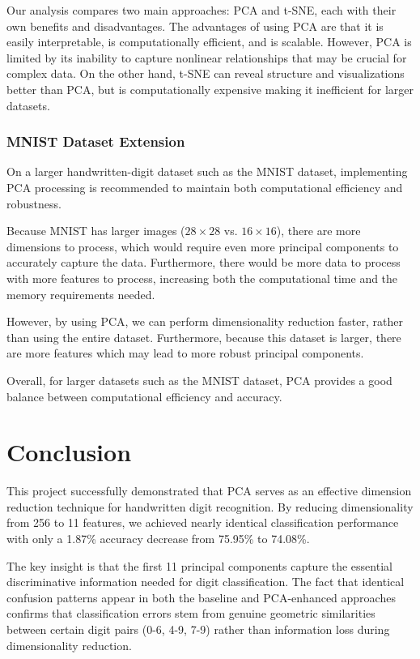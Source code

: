 \documentclass{article}
\begin{document}
Our analysis compares two main approaches: PCA and t-SNE, each with their own benefits and disadvantages. The advantages of using PCA are that it is easily interpretable, is computationally efficient, and is scalable. However, PCA is limited by its inability to capture nonlinear relationships that may be crucial for complex data. On the other hand, t-SNE can reveal structure and visualizations better than PCA, but is computationally expensive making it inefficient for larger datasets. 

\subsubsection{MNIST Dataset Extension}

On a larger handwritten-digit dataset such as the MNIST dataset, implementing PCA processing is recommended to maintain both computational efficiency and robustness. 

Because MNIST has larger images ($28 \times 28$ vs. $16 \times 16$), there are more dimensions to process, which would require even more principal components to accurately capture the data. Furthermore, there would be more data to process with more features to process, increasing both the computational time and the memory requirements needed. 

However, by using PCA, we can perform dimensionality reduction faster, rather than using the entire dataset. Furthermore, because this dataset is larger, there are more features which may lead to more robust principal components. 

Overall, for larger datasets such as the MNIST dataset, PCA provides a good balance between computational efficiency and accuracy. 


\section{Conclusion}
This project successfully demonstrated that PCA serves as an effective dimension reduction technique for handwritten digit recognition. By reducing dimensionality from 256 to 11 features, we achieved nearly identical classification performance with only a 1.87\% accuracy decrease from 75.95\% to 74.08\%.

The key insight is that the first 11 principal components capture the essential discriminative information needed for digit classification. The fact that identical confusion patterns appear in both the baseline and PCA-enhanced approaches confirms that classification errors stem from genuine geometric similarities between certain digit pairs (0-6, 4-9, 7-9) rather than information loss during dimensionality reduction.
\end{document}
